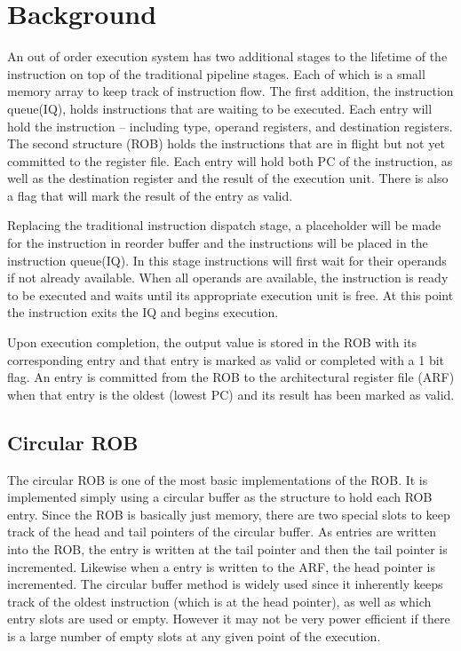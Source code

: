 \section{Background}
    An out of order execution system has two additional stages 
to the lifetime of the instruction on top of the traditional pipeline 
stages.  Each of which is a small memory array to keep track of instruction flow.
The first addition, the instruction queue(IQ), holds instructions that are 
waiting to be executed.  Each entry will hold the instruction -- including 
type, operand registers, and destination registers.  The second structure 
(ROB) holds the instructions that are in flight but not yet committed to the register
file. Each entry will hold both PC of the instruction, as well as the destination
register and the result of the execution unit.  There is also a flag that will
mark the result of the entry as valid.  

Replacing the traditional instruction dispatch stage, a placeholder will be made for the
instruction in reorder buffer and the instructions will be placed
in the instruction queue(IQ). In this stage instructions will first wait for their operands if not already
available.  When all operands are available, the instruction is ready to
be executed and waits until its appropriate execution unit is free.  At this
point the instruction exits the IQ and begins execution.

Upon execution completion, the output value is stored in the ROB with its 
corresponding entry and that entry is marked as valid or completed with a 
1 bit flag.  An entry is committed from the ROB to the architectural register
file (ARF) when that entry is the oldest (lowest PC) and its result has been 
marked as valid. 
\subsection{Circular ROB}
The circular ROB is one of the most basic implementations of the ROB.  It is implemented simply using
a circular buffer as the structure to hold each ROB entry.  Since the ROB is basically
just memory, there are two special slots to keep track of the head and tail
pointers of the circular buffer.  As entries are written into the ROB, the
entry is written at the tail pointer and then the tail pointer is incremented.
Likewise when a entry is written to the ARF, the head pointer is incremented.
The circular buffer method is widely used since it inherently keeps track of the 
oldest instruction (which is at the head pointer), as well as which entry slots
are used or empty.   However it may not be very power efficient if there is a large
number of empty slots at any given point of the execution.    

